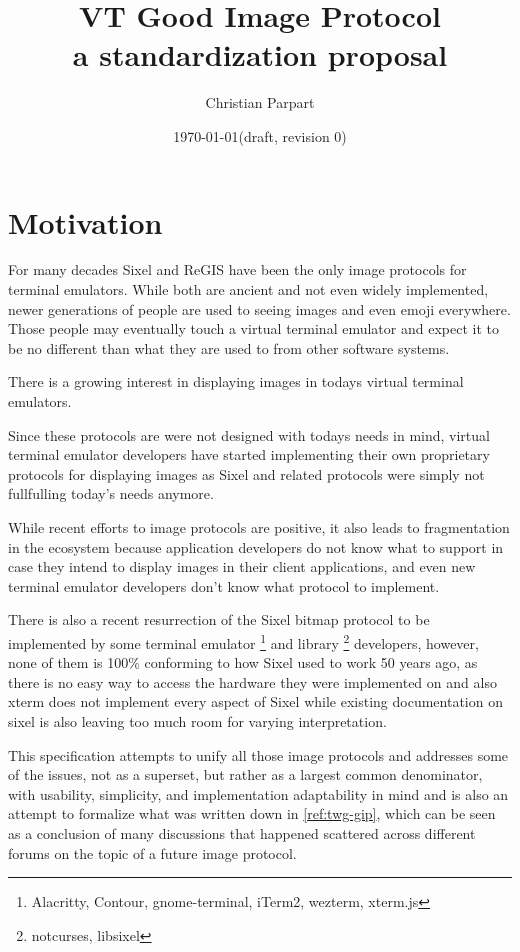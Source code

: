 \documentclass[a4paper]{article}
\title{VT Good Image Protocol \\
a standardization proposal}
\author{Christian Parpart}
\date{\today \quad (draft, revision 0)}
\begin{document}
\maketitle

\tableofcontents


\section{Motivation} %

For many decades Sixel and ReGIS have been the only image protocols for terminal emulators.
While both are ancient and not even widely implemented, newer generations of people are used
to seeing images and even emoji everywhere.
Those people may eventually touch a virtual terminal emulator and expect it to be no different
than what they are used to from other software systems.

There is a growing interest in displaying images in todays
virtual terminal emulators.

Since these protocols are were not designed with todays needs in mind,
virtual terminal emulator developers have started implementing their own
proprietary protocols for displaying images as Sixel and related
protocols were simply not fullfulling today's needs anymore.

While recent efforts to image protocols are positive, it also leads to fragmentation in the ecosystem
because application developers do not know what to support in case they intend
to display images in their client applications, and even new terminal emulator
developers don't know what protocol to implement.

There is also a recent resurrection of the Sixel bitmap protocol
to be implemented by some terminal emulator
\footnote{Alacritty, Contour, gnome-terminal, iTerm2, wezterm, xterm.js}
and library \footnote{notcurses, libsixel} developers,
however, none of them is 100\% conforming to how Sixel used to work 50 years ago,
as there is no easy way to access the hardware they were implemented on
and also xterm does not implement every aspect of Sixel while existing
documentation on sixel is also leaving too much room for varying interpretation.

This specification attempts to unify all those image protocols and addresses
some of the issues, not as a superset, but rather as a largest common denominator,
with usability, simplicity, and implementation adaptability in mind and
is also an attempt to formalize what was written down in \ref{ref:twg-gip},
which can be seen as a conclusion of many discussions that happened scattered
across different forums on the topic of a future image protocol.
\end{document}
